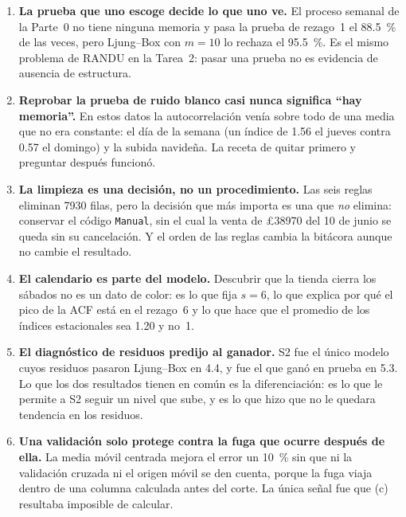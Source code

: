 \documentclass[11pt]{article}
\newcommand{\gbp}{\pounds}
\begin{document}
\begin{enumerate}[leftmargin=1.6em]
  \item \textbf{La prueba que uno escoge decide lo que uno ve.} El proceso
  semanal de la Parte~0 no tiene ninguna memoria y pasa la prueba de
  rezago~1 el \SI{88.5}{\percent} de las veces, pero Ljung--Box con $m=10$ lo
  rechaza el \SI{95.5}{\percent}. Es el mismo problema de RANDU en la
  Tarea~2: pasar una prueba no es evidencia de ausencia de estructura.

  \item \textbf{Reprobar la prueba de ruido blanco casi nunca significa
  ``hay memoria''.} En estos datos la autocorrelaci\'on ven\'ia sobre todo de
  una media que no era constante: el d\'ia de la semana (un \'indice de
  \num{1.56} el jueves contra \num{0.57} el domingo) y la subida navide\~na.
  La receta de quitar primero y preguntar despu\'es funcion\'o.

  \item \textbf{La limpieza es una decisi\'on, no un procedimiento.} Las
  seis reglas eliminan \num{7930} filas, pero la decisi\'on que m\'as
  importa es una que \emph{no} elimina: conservar el c\'odigo \texttt{Manual},
  sin el cual la venta de \gbp\num{38970} del 10 de junio se queda sin su
  cancelaci\'on. Y el orden de las reglas cambia la bit\'acora aunque no
  cambie el resultado.

  \item \textbf{El calendario es parte del modelo.} Descubrir que la tienda
  cierra los s\'abados no es un dato de color: es lo que fija $s=6$, lo que
  explica por qu\'e el pico de la ACF est\'a en el rezago~6 y lo que hace que
  el promedio de los \'indices estacionales sea \num{1.20} y no~\num{1}.

  \item \textbf{El diagn\'ostico de residuos predijo al ganador.} S2 fue el
  \'unico modelo cuyos residuos pasaron Ljung--Box en 4.4, y fue el que
  gan\'o en prueba en 5.3. Lo que los dos resultados tienen en com\'un es la
  diferenciaci\'on: es lo que le permite a S2 seguir un nivel que sube, y es
  lo que hizo que no le quedara tendencia en los residuos.

  \item \textbf{Una validaci\'on solo protege contra la fuga que ocurre
  despu\'es de ella.} La media m\'ovil centrada mejora el error un
  \SI{10}{\percent} sin que ni la validaci\'on cruzada ni el origen m\'ovil
  se den cuenta, porque la fuga viaja dentro de una columna calculada antes
  del corte. La \'unica se\~nal fue que (c) resultaba imposible de calcular.


\end{enumerate}
\end{document}
